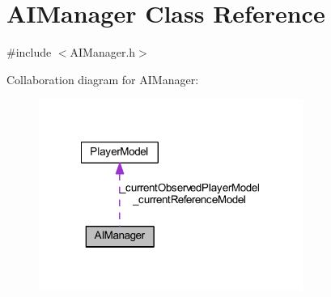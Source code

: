 \hypertarget{class_a_i_manager}{
\section{AIManager Class Reference}
\label{d1/d60/class_a_i_manager}
}


{\ttfamily \#include $<$AIManager.h$>$}



Collaboration diagram for AIManager:
\nopagebreak
\begin{figure}[H]
\begin{center}
\leavevmode
\includegraphics[width=245pt]{d3/dda/class_a_i_manager__coll__graph}
\end{center}
\end{figure}
